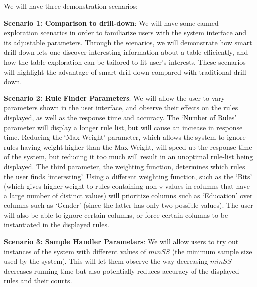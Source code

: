  We will have three demonstration scenarios:
\squishlist
\item {\bf Scenario 1: Comparison to drill-down}: We will have some canned exploration scenarios in order to familiarize users with the system interface and its adjustable parameters. Through the scenarios, we will demonstrate how smart drill down lets one discover interesting information about a table efficiently, and how the table exploration can be tailored to fit user's interests. These scenarios will highlight the advantage of smart drill down compared with traditional drill down. 
\item {\bf Scenario 2: Rule Finder Parameters}: We will allow the user to vary parameters shown in the user interface, and observe their effects on the rules displayed, as well as the response time and accuracy. The `Number of Rules' parameter will display a longer rule list, but will cause an increase in response time. Reducing the `Max Weight' parameter, which allows the system to ignore rules having weight higher than the Max Weight, will speed up the response time of the system, but reducing it too much will result in an unoptimal rule-list being displayed. The third parameter, the weighting function, determines which rules the user finds `interesting'. Using a different weighting function, such as the `Bits' (which gives higher weight to rules containing non-$\star$ values in columns that have a large number of distinct values) will prioritize columns such as `Education' over columns such as `Gender' (since the latter has only two possible values). The user will also be able to ignore certain columns, or force certain columns to be instantiated in the displayed rules. 
\item {\bf Scenario 3: Sample Handler Parameters}: We will allow users to try out instances of the system with different values of $minSS$ (the minimum sample size used by the system). This will let them observe the way decreasing $minSS$ decreases running time but also potentially reduces accuracy of the displayed rules and their counts.
\squishend
{} 
